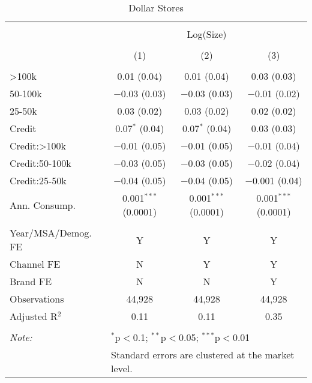 
\begin{table}[!htbp] \centering 
  \caption{Dollar Stores} 
  \label{tab:packageSizeDollarDetergent} 
\begin{tabular}{@{\extracolsep{5pt}}lccc} 
\\[-1.8ex]\hline 
\hline \\[-1.8ex] 
 & \multicolumn{3}{c}{Log(Size)} \\ 
\\[-1.8ex] & (1) & (2) & (3)\\ 
\hline \\[-1.8ex] 
 >100k & 0.01 (0.04) & 0.01 (0.04) & 0.03 (0.03) \\ 
  50-100k & $-$0.03 (0.03) & $-$0.03 (0.03) & $-$0.01 (0.02) \\ 
  25-50k & 0.03 (0.02) & 0.03 (0.02) & 0.02 (0.02) \\ 
  Credit & 0.07$^{*}$ (0.04) & 0.07$^{*}$ (0.04) & 0.03 (0.03) \\ 
  Credit:>100k & $-$0.01 (0.05) & $-$0.01 (0.05) & $-$0.01 (0.04) \\ 
  Credit:50-100k & $-$0.03 (0.05) & $-$0.03 (0.05) & $-$0.02 (0.04) \\ 
  Credit:25-50k & $-$0.04 (0.05) & $-$0.04 (0.05) & $-$0.001 (0.04) \\ 
  Ann. Consump. & 0.001$^{***}$ (0.0001) & 0.001$^{***}$ (0.0001) & 0.001$^{***}$ (0.0001) \\ 
 \hline \\[-1.8ex] 
Year/MSA/Demog. FE & Y & Y & Y \\ 
Channel FE & N & Y & Y \\ 
Brand FE & N & N & Y \\ 
Observations & 44,928 & 44,928 & 44,928 \\ 
Adjusted R$^{2}$ & 0.11 & 0.11 & 0.35 \\ 
\hline 
\hline \\[-1.8ex] 
\textit{Note:}  & \multicolumn{3}{l}{$^{*}$p$<$0.1; $^{**}$p$<$0.05; $^{***}$p$<$0.01} \\ 
 & \multicolumn{3}{l}{Standard errors are clustered at the market level.} \\ 
\end{tabular} 
\end{table} 
